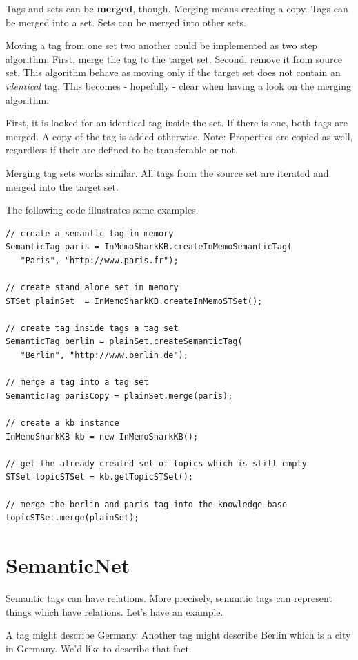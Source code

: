 Tags and sets can be {\bf merged}, though. Merging means creating a copy.
Tags can be merged into a set. Sets can be merged into other sets.

Moving a tag from one set two another could be implemented as two step algorithm: First, merge the tag to the target set. Second, remove it from source set. This algorithm behave as moving only if the target set does not contain an {\it identical} tag. This becomes - hopefully - clear when having a look on the merging algorithm:

First, it is looked for
an identical tag inside the set. If there is one, both tags are merged. A copy of the tag is added otherwise. Note: Properties are copied as well, regardless if their are defined to be transferable or not.

Merging tag sets works similar. All tags from the source set are iterated and merged into the target set.

The following code illustrates some examples.

\begin{verbatim}
// create a semantic tag in memory
SemanticTag paris = InMemoSharkKB.createInMemoSemanticTag(
   "Paris", "http://www.paris.fr");

// create stand alone set in memory
STSet plainSet  = InMemoSharkKB.createInMemoSTSet();

// create tag inside tags a tag set
SemanticTag berlin = plainSet.createSemanticTag(
   "Berlin", "http://www.berlin.de");

// merge a tag into a tag set
SemanticTag parisCopy = plainSet.merge(paris);

// create a kb instance
InMemoSharkKB kb = new InMemoSharkKB();

// get the already created set of topics which is still empty
STSet topicSTSet = kb.getTopicSTSet();

// merge the berlin and paris tag into the knowledge base
topicSTSet.merge(plainSet);
\end{verbatim}

\section{SemanticNet}
Semantic tags can have relations. More precisely, semantic tags can represent things which have relations. Let's have an example.

A tag might describe Germany. Another tag might describe Berlin which is a city in Germany. We'd like to describe that fact.

